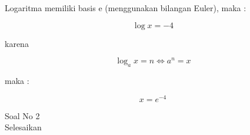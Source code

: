 \begin{eulernotebook}
\begin{eulercomment}
\begin{eulercomment}
\begin{eulercomment}
Logaritma memiliki basis e (menggunakan bilangan Euler), maka :\\
\end{eulercomment}
\begin{eulerformula}
\[
\log x = -4
\]
\end{eulerformula}
\begin{eulercomment}
karena\\
\end{eulercomment}
\begin{eulerformula}
\[
\log_{a} x = n \Leftrightarrow a^n = x
\]
\end{eulerformula}
\begin{eulercomment}
maka :\\
\end{eulercomment}
\begin{eulerformula}
\[
x = e^{-4}
\]
\end{eulerformula}
\begin{eulercomment}
\end{eulercomment}
\eulersubheading{}
\begin{eulercomment}
Soal No 2\\
Selesaikan


\end{eulercomment}
\end{eulercomment}
\end{eulercomment}
\end{eulernotebook}
